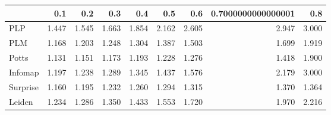\begin{tabular}{lrrrrrrrr}
\toprule
{} &   0.1 &   0.2 &   0.3 &   0.4 &   0.5 &   0.6 & 0.7000000000000001 &   0.8 \\
\midrule
PLP      & 1.447 & 1.545 & 1.663 & 1.854 & 2.162 & 2.605 &              2.947 & 3.000 \\
PLM      & 1.168 & 1.203 & 1.248 & 1.304 & 1.387 & 1.503 &              1.699 & 1.919 \\
Potts    & 1.131 & 1.151 & 1.173 & 1.193 & 1.228 & 1.276 &              1.418 & 1.900 \\
Infomap  & 1.197 & 1.238 & 1.289 & 1.345 & 1.437 & 1.576 &              2.179 & 3.000 \\
Surprise & 1.160 & 1.195 & 1.232 & 1.260 & 1.294 & 1.315 &              1.370 & 1.364 \\
Leiden   & 1.234 & 1.286 & 1.350 & 1.433 & 1.553 & 1.720 &              1.970 & 2.216 \\
\bottomrule
\end{tabular}
